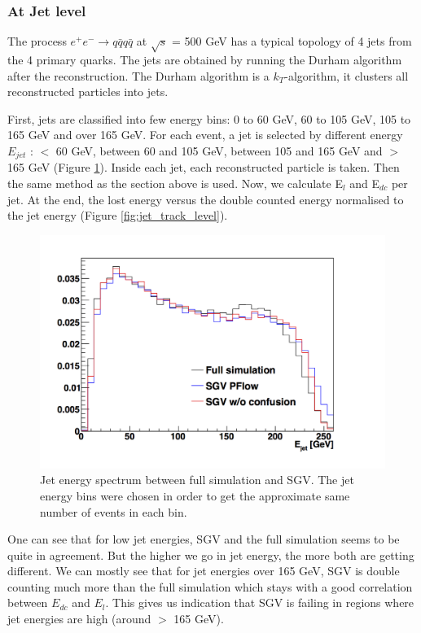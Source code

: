 \documentclass[a4paper,12pt]{article}
\begin{document}
\subsubsection{At Jet level}

The process $e^+e^- \rightarrow q\bar{q} q\bar{q}$ at $\sqrt{s}$ = 500 GeV has a typical topology of 4 jets from the 4 primary quarks. The jets are obtained by running the Durham algorithm after the reconstruction. The Durham algorithm is a $k_T$-algorithm, it clusters all reconstructed particles into jets. 

First, jets are classified into few energy bins: 0 to 60 GeV, 60 to 105 GeV, 105 to 165 GeV and over 165 GeV. For each event, a jet is selected by different energy $E_{jet}$ :  $<$ 60 GeV, between 60 and 105 GeV, between 105 and 165 GeV and $>$ 165 GeV (Figure \ref{fig:jet_spec}). Inside each jet,  each reconstructed particle is taken. Then the same method as the section above is used. Now, we calculate E$_l$ and E$_{dc}$ per jet. At the end, the lost energy versus the double counted energy normalised to the jet energy (Figure \ref{fig:jet_track_level}).

\begin{figure}[!h]
   \centering
  \includegraphics[scale=0.5]{Jet_spectrum.png} 
      \caption{Jet energy spectrum between full simulation and SGV. The jet energy bins were chosen in order to get the approximate same number of events in each bin.}
   \label{fig:jet_spec}
\end{figure}

One can see that for low jet energies, SGV and the full simulation seems to be quite in agreement. But the higher we go in jet energy, the more both are getting different. We can mostly see that for jet energies over 165 GeV, SGV is double counting much more than the full simulation which stays with a good correlation between $E_{dc}$ and $E_{l}$. This gives us indication that SGV is failing in regions where jet energies are high (around $>$ 165 GeV). 
\end{document}
